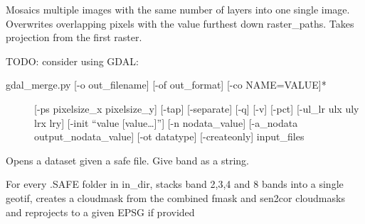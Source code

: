 \documentclass[letterpaper,10pt,english]{sphinxmanual}
\begin{document}
\begin{fulllineitems}
\label{\detokenize{index:pyeo.raster_manipulation.mosaic_images}}
Mosaics multiple images with the same number of layers into one single image. Overwrites
overlapping pixels with the value furthest down raster\_paths. Takes projection from the first
raster.

TODO: consider using GDAL:
\begin{description}
\item[{gdal\_merge.py {[}-o out\_filename{]} {[}-of out\_format{]} {[}-co NAME=VALUE{]}*}] \leavevmode
{[}-ps pixelsize\_x pixelsize\_y{]} {[}-tap{]} {[}-separate{]} {[}-q{]} {[}-v{]} {[}-pct{]}
{[}-ul\_lr ulx uly lrx lry{]} {[}-init “value {[}value…{]}”{]}
{[}-n nodata\_value{]} {[}-a\_nodata output\_nodata\_value{]}
{[}-ot datatype{]} {[}-createonly{]} input\_files

\end{description}

\end{fulllineitems}


\begin{fulllineitems}
\label{\detokenize{index:pyeo.raster_manipulation.open_dataset_from_safe}}
Opens a dataset given a safe file. Give band as a string.

\end{fulllineitems}


\begin{fulllineitems}
\label{\detokenize{index:pyeo.raster_manipulation.preprocess_sen2_images}}
For every .SAFE folder in in\_dir, stacks band 2,3,4 and 8  bands into a single geotif, creates a cloudmask from
the combined fmask and sen2cor cloudmasks and reprojects to a given EPSG if provided

\end{fulllineitems}
\end{document}
